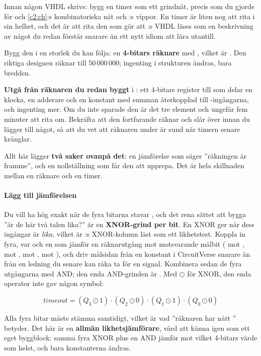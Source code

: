 Innan någon VHDL skrivs: bygg en timer som ett grindnät, precis som du gjorde för 
och \ref{c2:ch}:s kombinatoriska nät och :s vippor. En timer är liten nog att rita i
sin helhet, och det är att rita den som gör att :s VHDL läses som en
beskrivning av något du redan förstår snarare än ett nytt idiom att lära utantill.

Bygg den i en storlek du kan följa: en \textbf{4-bitars räknare} med , vilket
är . Den riktiga designen räknar till 50\,000\,000; ingenting i strukturen ändras, bara
bredden.

\textbf{Utgå från räknaren du redan byggt} i : ett 4-bitars register
 till  som delar en klocka, en adderare och en konstant  med summan
återkopplad till -ingångarna, och ingenting mer. Om du inte sparade den är det tre element
och ungefär fem minuter att rita om. Bekräfta att den fortfarande räknar och slår över innan du
lägger till något, så att du vet att räknaren under är sund när timern senare krånglar.

Allt här lägger \textbf{två saker ovanpå det}: en jämförelse som säger ”räkningen är framme”, och en
nollställning som får den att upprepa. Det är hela skillnaden mellan en räknare och en timer.

\paragraph{Lägg till jämförelsen}
Du vill ha  hög exakt när de fyra bitarna stavar , och det rena sättet att
bygga ”är de här två talen lika?” är en \textbf{XNOR-grind per bit}. En XNOR ger  när dess
ingångar är \emph{lika}, vilket är :s XNOR-kolumn läst som ett likhetstest.
Koppla in fyra, var och en som jämför en räknarutgång mot motsvarande målbit ( mot
,  mot ,  mot ,  mot ), och driv
målsidan från en konstant i CircuitVerse snarare än från en ledning du senare kan råka ta för en
signal. Kombinera sedan de fyra utgångarna med AND; den enda AND-grinden är . Med
$\odot$ för XNOR, den enda operator  inte gav någon symbol:

\[ \mathit{timeout} = (Q_3 \odot 1) \cdot (Q_2 \odot 0) \cdot (Q_1 \odot 1) \cdot (Q_0 \odot 0) \]

Alla fyra bitar måste stämma samtidigt, vilket är vad ”räknaren har nått ” betyder. Det
här är en \textbf{allmän likhetsjämförare}, värd att känna igen som ett eget byggblock: samma fyra
XNOR plus en AND jämför mot vilket 4-bitars värde som helst, och bara konstanterna ändras.

